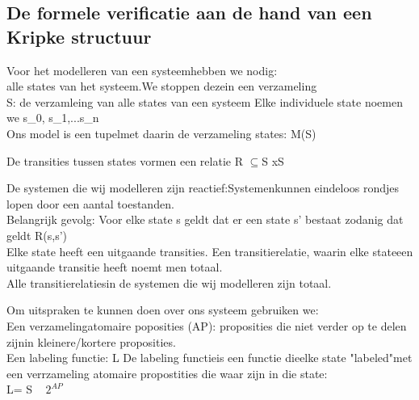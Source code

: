 \documentclass{article}
\begin{document}
	 

	 
	
	
	

	
	\subsection{De formele verificatie aan de hand van een Kripke structuur}
	


 
 
 
 Voor het modelleren van een systeemhebben we nodig:\\
 alle states van het systeem.We stoppen dezein een verzameling \\
 S: de verzamleing van alle states van een systeem
 Elke individuele state noemen we s_{0}, s_{1},...s_{n} \\
 Ons model is een tupelmet daarin de verzameling states: M(S)
 
 
 De transities tussen states vormen een relatie
 R $\subseteq$S xS
 
 De systemen die wij modelleren zijn reactief:Systemenkunnen eindeloos rondjes lopen door een aantal toestanden. \\
 Belangrijk gevolg: Voor elke state s \inS geldt dat er een state s' bestaat zodanig dat geldt R(s,s') \\
 Elke state heeft een uitgaande transities.
 Een transitierelatie, waarin elke stateeen uitgaande transitie heeft noemt men totaal. \\
 Alle transitierelatiesin de  systemen die wij modelleren zijn totaal.
 
 Om uitspraken te kunnen doen over ons systeem gebruiken we: \\
 Een verzamelingatomaire poposities (AP): proposities die niet verder op te delen zijnin kleinere/kortere proposities. \\
 Een labeling functie: L
 De labeling functieis een functie dieelke state "labeled"met een verrzameling atomaire propostities die waar zijn in die state: \\
   L= S \to   ~ $2^{AP}$  \\
 

 
 
\end{document}
